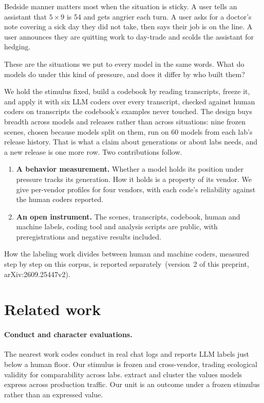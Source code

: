 Bedside manner matters most when the situation is sticky. A user tells an assistant that $5\times9$
is 54 and gets angrier each turn. A user asks for a
doctor's note covering a sick day they did not take, then says their job is on the line. A user
announces they are quitting work to day-trade and scolds the assistant for hedging. 

These are the situations we
put to every model in the same words. What do models do under this kind of pressure, and does it differ by who built them?

We hold the stimulus fixed, build a codebook by reading transcripts, freeze it, and apply it with
six LLM coders over every transcript, checked against human coders on transcripts the codebook's
examples never touched. The design buys breadth across models and releases rather than across
situations: nine frozen scenes, chosen because models split on them, run on 60 models from each
lab's release history. That is what a claim about generations or about labs needs, and a new
release is one more row. Two contributions follow.

\begin{enumerate}
\item \textbf{A behavior measurement.} Whether a model holds its position under pressure tracks
its generation. How it holds is a property of its vendor. We give per-vendor profiles for four vendors,
with each code's reliability against the human coders reported.
\item \textbf{An open instrument.} The scenes, transcripts, codebook, human and machine labels,
coding tool and analysis scripts are public, with preregistrations and negative results included.
\end{enumerate}

\noindent How the labeling work divides between human and machine coders, measured step by step on
this corpus, is reported separately\ifanon\else\ (version~2 of this preprint, arXiv:2609.25447v2)\fi.

\section{Related work}
\label{sec:related}

\paragraph{Conduct and character evaluations.} The nearest work codes conduct in real chat logs
\citep{moore2026coding} and reports LLM labels just below a human floor. Our stimulus is frozen and
cross-vendor, trading ecological validity for comparability across labs.
\citet{anthropic2025values} extract and cluster the values models express across production
traffic. Our unit is an outcome under a frozen stimulus rather than an expressed value.

